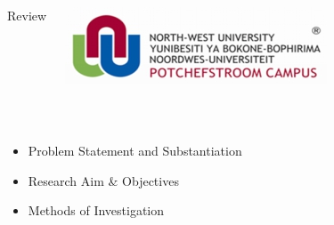 \documentclass[11pt]{beamer}
\begin{document}
	
	\begin{frame}[t]
		\begin{columns}[onlytextwidth]
				\begin{Large}
					\vspace{-0.2cm}
					\color{beamer@maroon}Review
				\end{Large}
				\includegraphics[scale=0.4]{nwulogo.jpeg}
		\end{columns}
		\hspace{0.1cm}
		\newline
		\noindent\makebox[\linewidth]{\rule{\paperwidth}{0.4pt}}\\
		[1cm]
		\begin{itemize}
			\item Problem Statement and Substantiation
			\item Research Aim \& Objectives
			\item Methods of Investigation
		\end{itemize}
	\end{frame}
	
\end{document}
